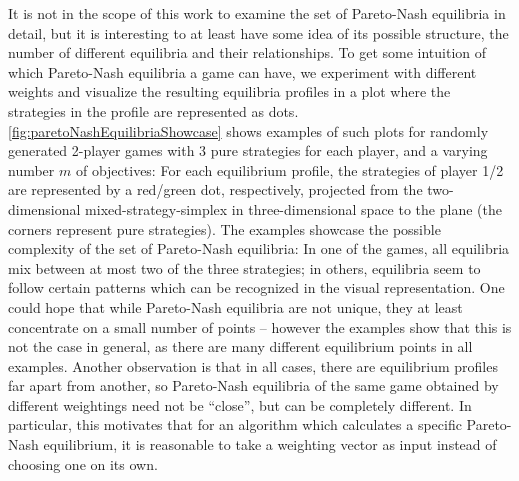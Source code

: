 \documentclass[a4paper,DIV=11]{scrreprt}
\theoremstyle{definition}
\begin{document}
    It is not in the scope of this work to examine the set of Pareto-Nash equilibria in detail, but it is interesting to at least have some idea of its possible structure, 
    the number of different equilibria and their relationships.
    To get some intuition of which Pareto-Nash equilibria a game can have, we experiment with different weights and visualize the resulting equilibria profiles in a plot where the strategies in the profile are represented as dots.
    \autoref{fig:paretoNashEquilibriaShowcase}
    shows examples of such plots for randomly generated 2-player games with 3 pure strategies for each player, and a varying number $m$ of objectives: For each equilibrium profile, the strategies of player 1/2 are represented by a red/green dot, respectively, projected from the two-dimensional mixed-strategy-simplex in three-dimensional space to the plane 
    (the corners represent pure strategies).
    The examples showcase the possible complexity of the set of Pareto-Nash equilibria:
    In one of the games, all equilibria mix between at most two of the three strategies; in others, equilibria seem to follow certain patterns which can be recognized in the visual representation.
    One could hope that while Pareto-Nash equilibria are not unique, they at least concentrate on a small number of points -- however the examples show that this is not the case in general, as there are many different equilibrium points in all examples.
    Another observation is that in all cases, there are equilibrium profiles far apart from another, so Pareto-Nash equilibria of the same game obtained by different weightings need not be “close”, but can be completely different.
    In particular, this motivates that for an algorithm which calculates a specific Pareto-Nash equilibrium, it is reasonable to take a weighting vector as input instead of choosing one on its own.
\end{document}
